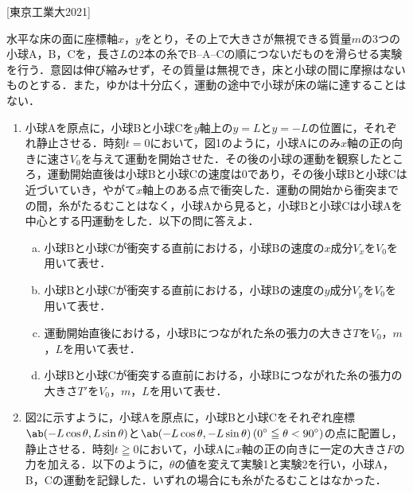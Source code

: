 

\noindent
{} [東京工業大2021]

水平な床の面に座標軸$x$，$y$をとり，その上で大きさが無視できる質量$m$の3つの小球A，B，Cを，長さ$L$の2本の糸でB--A--Cの順につないだものを滑らせる実験を行う．意図は伸び縮みせず，その質量は無視でき，床と小球の間に摩擦はないものとする．また，ゆかは十分広く，運動の途中で小球が床の端に達することはない．

\begin{enumerate}[label={〔\Alph*〕}]
  \item {\hzw}小球Aを原点に，小球Bと小球Cを$y$軸上の$y = L$と$y = -L$の位置に，それぞれ静止させる．時刻$t = 0$において，図1のように，小球Aにのみ$x$軸の正の向きに速さ$V_0$を与えて運動を開始させた．その後の小球の運動を観察したところ，運動開始直後は小球Bと小球Cの速度は0であり，その後小球Bと小球Cは近づいていき，やがて$x$軸上のある点で衝突した．運動の開始から衝突までの間，糸がたるむことはなく，小球Aから見ると，小球Bと小球Cは小球Aを中心とする円運動をした．以下の問に答えよ．
  \begin{enumerate}[(a)]
    \item {\hzw}小球Bと小球Cが衝突する直前における，小球Bの速度の$x$成分$V_x$を$V_0$を用いて表せ．
    \item {\hzw}小球Bと小球Cが衝突する直前における，小球Bの速度の$y$成分$V_y$を$V_0$を用いて表せ．
    \item {\hzw}運動開始直後における，小球Bにつながれた糸の張力の大きさ$T$を$V_0$，$m$，$L$を用いて表せ．
    \item {\hzw}小球Bと小球Cが衝突する直前における，小球Bにつながれた糸の張力の大きさ$T'$を$V_0$，$m$，$L$を用いて表せ．
  \end{enumerate}
  \item {\hzw}図2に示すように，小球Aを原点に，小球Bと小球Cをそれぞれ座標$\ds \ab(-L\cos\theta, L\sin\theta)$と$\ds \ab(-L\cos\theta, -L\sin\theta)\, ( 0\deg \leqq \theta <  90 \deg)$の点に配置し，静止させる．時刻$t \geqq 0$において，小球Aに$x$軸の正の向きに一定の大きさ$F$の力を加える．以下のように，$\theta$の値を変えて実験1と実験2を行い，小球A，B，Cの運動を記録した．いずれの場合にも糸がたるむことはなかった．
  


\end{enumerate}
